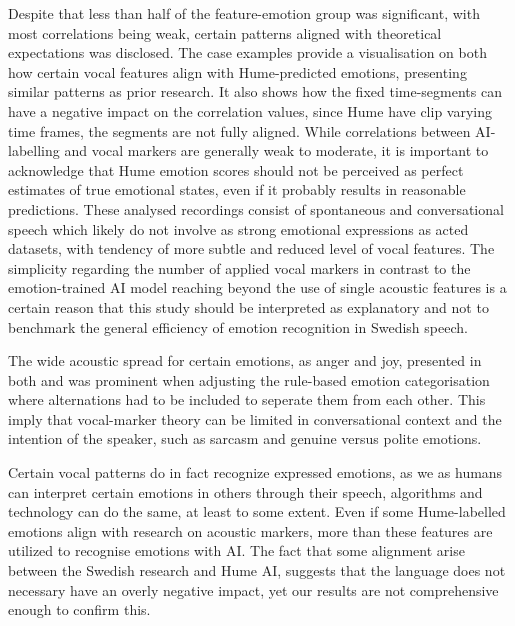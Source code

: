 Despite that less than half of the feature-emotion group was significant, with most correlations being weak, certain patterns aligned with theoretical expectations was disclosed. The case examples provide a visualisation on both how certain vocal features align with Hume-predicted emotions, presenting similar patterns as prior research. It also shows how the fixed time-segments can have a negative impact on the correlation values, since Hume have clip varying time frames, the segments are not fully aligned.  
While correlations between AI-labelling and vocal markers are generally weak to moderate, it is important to acknowledge that Hume emotion scores should not be perceived as perfect estimates of true emotional states, even if it probably results in reasonable predictions. 
These analysed recordings consist of spontaneous and conversational speech which likely do not involve as strong emotional expressions as acted datasets, with tendency of more subtle and reduced level of vocal features. The simplicity regarding the number of applied vocal markers in contrast to the emotion-trained AI model reaching beyond the use of single acoustic features is a certain reason that this study should be interpreted as explanatory and not to benchmark the general efficiency of emotion recognition in Swedish speech.    

The wide acoustic spread for certain emotions, as anger and joy, presented in both \autocites{Banse1996}{Ekberg2023} and was prominent when adjusting the rule-based emotion categorisation where alternations had to be included to seperate them from each other. 
This imply that vocal-marker theory can be limited in conversational context and the intention of the speaker, such as sarcasm and genuine versus polite emotions. 

Certain vocal patterns do in fact recognize expressed emotions, as we as humans can interpret certain emotions in others through their speech, algorithms and technology can do the same, at least to some extent. 
Even if some Hume-labelled emotions align with research on acoustic markers, more than these features are utilized to recognise emotions with AI. The fact that some alignment arise between the Swedish research and Hume AI, 
suggests that the language does not necessary have an overly negative impact, yet our results are not comprehensive enough to confirm this. 